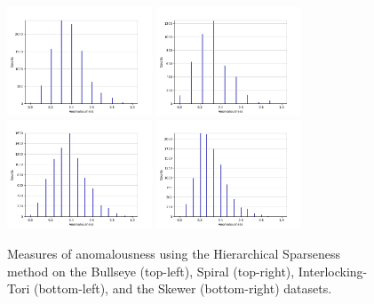 \begin{figure}[!t]
\centering
\includegraphics[width=1.7in]{static/bullseye_hierarchical.png}
\includegraphics[width=1.7in]{static/spiral_hierarchical.png}
\includegraphics[width=1.7in]{static/interlocking_tori_hierarchical.png}
\includegraphics[width=1.7in]{static/skewer_hierarchical.png}

\caption{
Measures of anomalousness using the Hierarchical Sparseness method on the Bullseye (top-left), Spiral (top-right), Interlocking-Tori (bottom-left), and the Skewer (bottom-right) datasets.
}

\label{results:histograms:hierarchical}
\end{figure}


